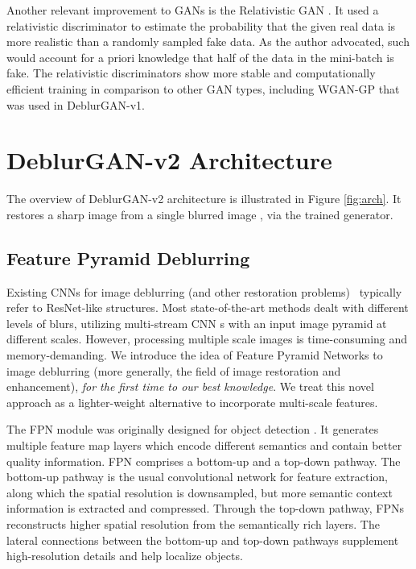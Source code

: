 \documentclass[10pt,twocolumn,letterpaper]{article}
\begin{document}
Another relevant improvement to GANs is the Relativistic GAN \cite{jolicoeur2018relativistic}. It used a relativistic discriminator to estimate the probability that the given real data is more realistic than a randomly sampled fake data. As the author advocated, such would account for a priori knowledge that half of the data in the mini-batch is fake. 
The relativistic discriminators show more stable and computationally efficient training in comparison to other GAN types, including WGAN-GP \cite{WGAN-GP} that was used in DeblurGAN-v1.







\vspace{-0.2em}
\section{DeblurGAN-v2 Architecture}
\vspace{-0.5em}
The overview of DeblurGAN-v2 architecture is illustrated in Figure \ref{fig:arch}. It restores a sharp image  from a single blurred image , via the trained generator.





\vspace{-0.2em}
\subsection{Feature Pyramid Deblurring}
\vspace{-0.4em}
Existing CNNs for image deblurring (and other restoration problems)~\cite{SRGAN,Nah2016DeepDeblurring} typically refer to ResNet-like structures. Most state-of-the-art methods \cite{Nah2016DeepDeblurring,tao2018scale} dealt with different levels of blurs, utilizing multi-stream CNN s with an input image pyramid at different scales. However, processing multiple scale images is time-consuming and memory-demanding. We introduce the idea of Feature Pyramid Networks \cite{lin2017feature} to image deblurring (more generally, the field of image restoration and enhancement), \textit{for the first time to our best knowledge}. We treat this novel approach as a lighter-weight alternative to incorporate multi-scale features. 


The FPN module was originally designed for object detection \cite{lin2017feature}. It generates multiple feature map layers which encode different semantics and contain better quality information. FPN comprises a bottom-up and a top-down pathway. The bottom-up pathway is the usual convolutional network for feature extraction, along which the spatial resolution is downsampled, but more semantic context information is extracted and compressed. Through the top-down pathway, FPNs reconstructs higher spatial resolution from the semantically rich layers. The lateral connections between the bottom-up and top-down pathways supplement high-resolution details and help localize objects. 
\end{document}
